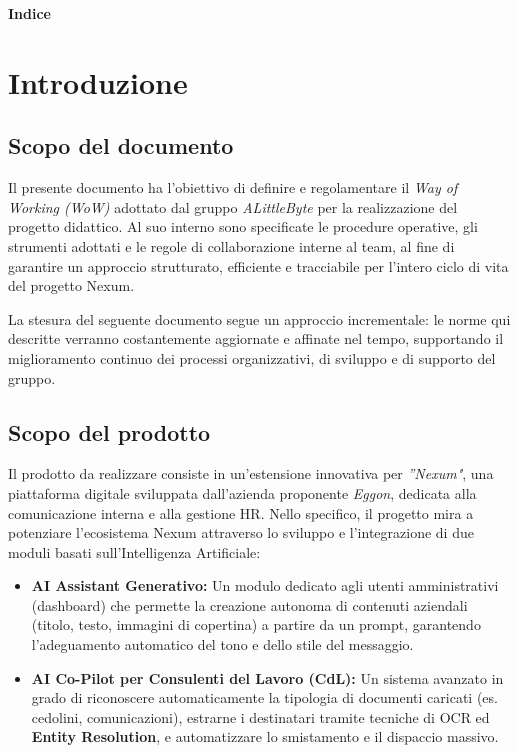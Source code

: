 \documentclass[a4paper,12pt]{article}
\begin{document}
\begin{center} 
    {\Large \textbf{Indice}}
\end{center}

\vspace{0.6cm}

\tableofcontents

\newpage
{}
\setcounter{page}{4}

\section{Introduzione}

\subsection{Scopo del documento}
Il presente documento ha l'obiettivo di definire e regolamentare il \textit{Way of Working (WoW)} adottato dal gruppo \textit{ALittleByte} per la realizzazione del progetto didattico. Al suo interno sono specificate le procedure operative, gli strumenti adottati e le regole di collaborazione interne al team, al fine di garantire un approccio strutturato, efficiente e tracciabile per l'intero ciclo di vita del progetto Nexum. 

La stesura del seguente documento segue un approccio incrementale: le norme qui descritte verranno costantemente aggiornate e affinate nel tempo, supportando il miglioramento continuo dei processi organizzativi, di sviluppo e di supporto del gruppo.


\subsection{Scopo del prodotto}
Il prodotto da realizzare consiste in un'estensione innovativa per \textit{''Nexum"}, una piattaforma digitale sviluppata dall'azienda proponente \textit{Eggon}, dedicata alla comunicazione interna e alla gestione HR.
Nello specifico, il progetto mira a potenziare l'ecosistema Nexum attraverso lo sviluppo e l'integrazione di due moduli basati sull'Intelligenza Artificiale:
\begin{itemize}
    \item \textbf{AI Assistant Generativo:} Un modulo dedicato agli utenti amministrativi (dashboard) che permette la creazione autonoma di contenuti aziendali (titolo, testo, immagini di copertina) a partire da un prompt, garantendo l'adeguamento automatico del tono e dello stile del messaggio.
    \item \textbf{AI Co-Pilot per Consulenti del Lavoro (CdL):} Un sistema avanzato in grado di riconoscere automaticamente la tipologia di documenti caricati (es. cedolini, comunicazioni), estrarne i destinatari tramite tecniche di OCR ed \textbf{Entity Resolution}, e automatizzare lo smistamento e il dispaccio massivo.
\end{itemize}
\end{document}

